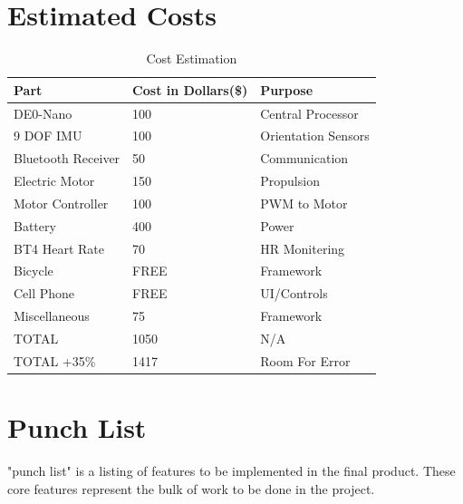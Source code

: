\documentclass[12pt,article]{IEEEtran}
\begin{document}
\section{Estimated Costs}
    \begin{table}[H]
		\renewcommand{\arraystretch}{1.3}
			\caption{Cost Estimation}
			
			\label{Team Hour Summary}
			
			\centering
			\begin{tabular}{p{3cm}|p{1.4cm}|p{3.2cm}}
			\hline
			\bfseries 	Part 				& \bfseries Cost in Dollars(\$) & \bfseries Purpose     \\
			\hline\hline
						DE0-Nano 		    & 100							&	Central Processor   \\
						9 DOF IMU    		& 100			            	&   Orientation Sensors	\\	
						Bluetooth Receiver	& 50				            &   Communication       \\	
						Electric Motor		& 150				            &   Propulsion        	\\
                        Motor Controller    & 100							&	PWM to Motor        \\
						Battery     		& 400			            	&   Power           	\\	
						BT4 Heart Rate  	& 70				            &   HR Monitering       \\	
						Bicycle     		& FREE				            &   Framework        	\\
                        Cell Phone          & FREE                          &   UI/Controls         \\
                    	Miscellaneous		& 75				            &   Framework        	\\
                        TOTAL               & 1050                          &   N/A                 \\        
                        \hline
                        TOTAL +35\%         & 1417                          &   Room For Error      \\        
			            \hline
			\end{tabular}
		\end{table}

\section{Punch List}
	 "punch list" is a listing of features to be implemented in the final
	product. These core features represent the bulk of work to be done in the project. 
	
\end{document}
